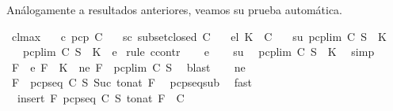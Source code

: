 \begin{isabellebody}
%
\endisadelimproof
%
\begin{isamarkuptext}%
Análogamente a resultados anteriores, veamos su prueba automática.%
\end{isamarkuptext}\isamarkuptrue%
\isamarkupfalse%
\ cl{\isacharunderscore}max{\isacharcolon}\isanewline
\ \ \ c{\isacharcolon}\ {\isachardoublequoteopen}pcp\ C{\isachardoublequoteclose}\isanewline
\ \ \ sc{\isacharcolon}\ {\isachardoublequoteopen}subset{\isacharunderscore}closed\ C{\isachardoublequoteclose}\isanewline
\ \ \ el{\isacharcolon}\ {\isachardoublequoteopen}K\ {\isasymin}\ C{\isachardoublequoteclose}\isanewline
\ \ \ su{\isacharcolon}\ {\isachardoublequoteopen}pcp{\isacharunderscore}lim\ C\ S\ {\isasymsubseteq}\ K{\isachardoublequoteclose}\isanewline
\ \ \ {\isachardoublequoteopen}pcp{\isacharunderscore}lim\ C\ S\ {\isacharequal}\ K{\isachardoublequoteclose}\ {\isacharparenleft}\ {\isacharquery}e{\isacharparenright}\isanewline
%
\isadelimproof
%
\endisadelimproof
%
\isatagproof
{}\isamarkupfalse%
\ {\isacharparenleft}rule\ ccontr{\isacharparenright}\isanewline
\ \ \isamarkupfalse%
\ {\isacartoucheopen}{\isasymnot}{\isacharquery}e{\isacartoucheclose}\isanewline
\ \ \isamarkupfalse%
\ su\ \isamarkupfalse%
\ {\isachardoublequoteopen}pcp{\isacharunderscore}lim\ C\ S\ {\isasymsubset}\ K{\isachardoublequoteclose}\ \isamarkupfalse%
\ simp\isanewline
\ \ \isamarkupfalse%
\ \isamarkupfalse%
\ F\ \ e{\isacharcolon}\ {\isachardoublequoteopen}F\ {\isasymin}\ K{\isachardoublequoteclose}\ \ ne{\isacharcolon}\ {\isachardoublequoteopen}F\ {\isasymnotin}\ pcp{\isacharunderscore}lim\ C\ S{\isachardoublequoteclose}\ \isamarkupfalse%
\ blast\isanewline
\ \ \isamarkupfalse%
\ ne\ \isamarkupfalse%
\ {\isachardoublequoteopen}F\ {\isasymnotin}\ pcp{\isacharunderscore}seq\ C\ S\ {\isacharparenleft}Suc\ {\isacharparenleft}to{\isacharunderscore}nat\ F{\isacharparenright}{\isacharparenright}{\isachardoublequoteclose}\ \isamarkupfalse%
\ pcp{\isacharunderscore}seq{\isacharunderscore}sub\ \isamarkupfalse%
\ fast\isanewline
\ \ \isamarkupfalse%
\ {}{\isacharcolon}\ {\isachardoublequoteopen}insert\ F\ {\isacharparenleft}pcp{\isacharunderscore}seq\ C\ S\ {\isacharparenleft}to{\isacharunderscore}nat\ F{\isacharparenright}{\isacharparenright}\ {\isasymnotin}\ C{\isachardoublequoteclose}\ \isamarkupfalse%

\end{isabellebody}
